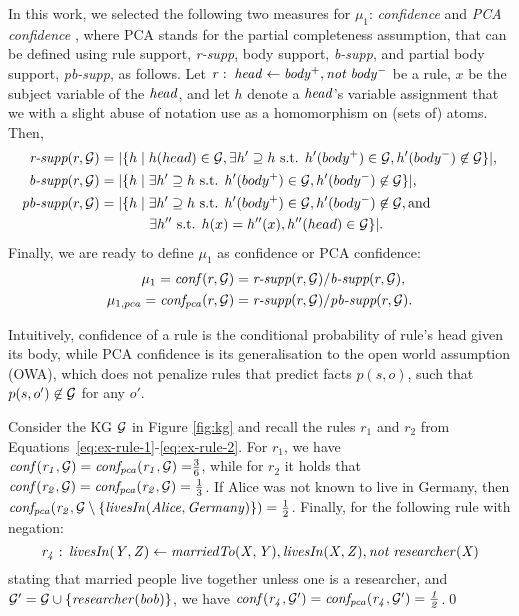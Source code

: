 In this work, we selected the following two measures for $\mu_1$:
\emph{confidence} and \emph{PCA confidence} \cite{amie}, where PCA stands for the partial completeness assumption,
that can be defined using 
rule support, \emph{r-supp}, 
body support, \emph{b-supp}, and
partial body support, \emph{pb-supp}, as follows.
Let $\mathit{r:\; head\leftarrow body^+, not\;  body^-}$ be a rule, $x$ be the subject variable of the $\mathit{head}$, 
and let $h$ denote a $\mathit{head}$'s variable assignment that we with a slight abuse of notation
use as a homomorphism on (sets of) atoms.
Then, 
\begin{align*}
	\textit{r-supp}(r,\mathcal{G}) & =
		|\{h \mid 
				h(head) \in \mathcal{G}, 
				\exists h'\supseteq h \text{ s.t. } 
				h'(body^+) \in \mathcal{G}, 
 				h'(body^-) \not \in \mathcal{G}\}|,\\
	\textit{b-supp}(r,\mathcal{G}) & =
		|\{h \mid
				\exists h'\supseteq h \text{ s.t. } 
				h'(body^+) \in \mathcal{G}, 
 				h'(body^-) \not \in \mathcal{G}\}|,\\
	\textit{pb-supp}(r,\mathcal{G}) & = 
		|\{h \mid
				\exists h'\supseteq h \text{ s.t. } 
				h'(body^+) \in \mathcal{G}, 
 				h'(body^-) \not \in \mathcal{G}, \text{and}\\
&\quad\quad\quad\;\; \exists h'' \text{ s.t. } h(x)= h''(x),
				h''(head) \in \mathcal{G}\}|.
\end{align*}
Finally, we are ready to define $\mu_1$ as confidence or PCA confidence:
\begin{align*}
\mu_1 = \mathit{conf}(r,\mathcal{G}) & = \textit{r-supp}(r,\mathcal{G})/\textit{b-supp}(r,\mathcal{G}),\\
\mu_{1,pca} = \mathit{conf_{pca}}(r,\mathcal{G}) & = \textit{r-supp}(r,\mathcal{G})/\textit{pb-supp}(r,\mathcal{G}).
\end{align*}


Intuitively, confidence of a rule is the conditional probability of rule's head given its body, while PCA confidence is its generalisation to the open world assumption (OWA), which does not penalize rules that predict facts $p(s,o)$, such that $p(s,o')\not \in \mathcal{G}$ for any $o'$.



\begin{example}\label{ex:m}
Consider the KG $\mathcal{G}$ in Figure \ref{fig:kg} and recall the rules $r_1$ and $r_2$ from Equations~\eqref{eq:ex-rule-1}-\eqref{eq:ex-rule-2}.
For $r_1$, we have $\mathit{conf(r_1,\mathcal{G})=conf_{pca}(r_1,\mathcal{G})=} \frac{3}{6}$, while
for $r_2$ it holds that  $\mathit{conf(r_2,\mathcal{G})}=\mathit{conf_{pca}(r_2,\mathcal{G})}=\frac{1}{3}$. If Alice was not known to live in Germany, then $\mathit{conf_{pca}(r_2,\mathcal{G} \setminus \{livesIn(Alice, Germany)\})}=\frac{1}{2}$. 
Finally, for the following rule with negation:
\[\mathit{r_4:\,livesIn(Y,Z) \leftarrow marriedTo(X,Y), livesIn(X,Z), not\;researcher(X)}
\]
stating that married people live together unless one is a researcher, 
and $\mathcal{G}'=\mathcal{G}\cup\{\mathit{researcher(bob)}\}$, we have $\mathit{conf(r_4,\mathcal{G}')=conf_{pca}(r_4,\mathcal{G}')=\frac{1}{2}}$.\qed
\end{example}

